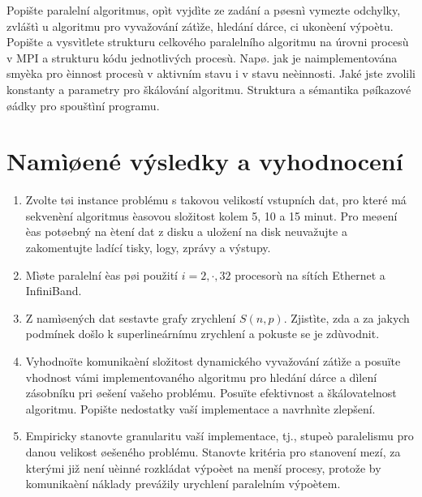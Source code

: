 \documentclass[12pt]{article}
\begin{document}
Popište paralelní algoritmus, opìt vyjdìte ze zadání a pøesnì
vymezte odchylky, zvláštì u algoritmu pro vyvažování zátìže, hledání
dárce, ci ukonèení výpoètu.  Popište a vysvìtlete strukturu
celkového paralelního algoritmu na úrovni procesù v MPI a strukturu
kódu jednotlivých procesù. Napø. jak je naimplementována smyèka pro
èinnost procesù v aktivním stavu i v stavu neèinnosti. Jaké jste
zvolili konstanty a parametry pro škálování algoritmu. Struktura a
sémantika pøíkazové øádky pro spouštìní programu.

\section{Namìøené výsledky a vyhodnocení}

\begin{enumerate}
\item Zvolte tøi instance problému s takovou velikostí vstupních dat, pro které má
sekvenèní algoritmus èasovou složitost kolem 5, 10 a 15 minut. Pro
meøení èas potøebný na ètení dat z disku a uložení na disk
neuvažujte a zakomentujte ladící tisky, logy, zprávy a výstupy.
\item Mìøte paralelní èas pøi použití $i=2,\cdot,32$ procesorù na sítích Ethernet a InfiniBand.
\item Z namìøených dat sestavte grafy zrychlení $S(n,p)$. Zjistìte, zda a za jakych podmínek
došlo k superlineárnímu zrychlení a pokuste se je zdùvodnit.
\item Vyhodnoïte komunikaèní složitost dynamického vyvažování zátìže a posuïte
vhodnost vámi implementovaného algoritmu pro hledání dárce a dìlení
zásobníku pri øešení vašeho problému. Posuïte efektivnost a
škálovatelnost algoritmu. Popište nedostatky vaší implementace a
navrhnìte zlepšení.
\item Empiricky stanovte
granularitu vaší implementace, tj., stupeò paralelismu pro danou
velikost øešeného problému. Stanovte kritéria pro stanovení mezí, za
kterými již není uèinné rozkládat výpoèet na menší procesy, protože
by komunikaèní náklady prevážily urychlení paralelním výpoètem.

\end{enumerate}
\end{document}
